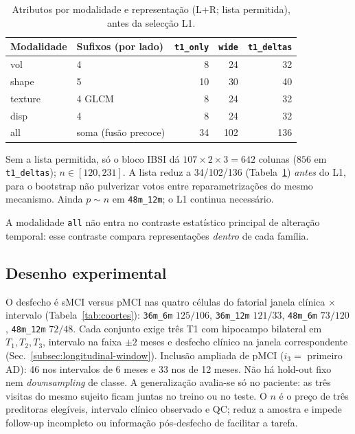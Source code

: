 \documentclass[review]{elsarticle}
\newcommand{\code}[1]{\texttt{#1}}
\begin{document}
	\begin{table}[htbp]
		\centering
		\caption{Atributos por modalidade e representação (L$+$R; lista permitida), antes da selecção L1.}
		\label{tab:dims}
		\begin{tabular}{llrrr}
			\toprule
			Modalidade & Sufixos (por lado) & \code{t1\_only} & \code{wide} & \code{t1\_deltas} \\
			\midrule
			vol     & 4 & 8  & 24  & 32 \\
			shape   & 5 & 10 & 30  & 40 \\
			texture & 4 GLCM & 8  & 24  & 32 \\
			disp    & 4 & 8 & 24 & 32 \\
			all     & soma (fusão precoce) & 34 & 102 & 136 \\
			\bottomrule
		\end{tabular}
	\end{table}
	
	Sem a lista permitida, só o bloco IBSI dá $107\times 2\times 3=642$ colunas ($856$ em \code{t1\_deltas});
$n\in[120,231]$. A lista reduz a 34/102/136 (Tabela~\ref{tab:dims}) \emph{antes} do L1,
para o bootstrap não pulverizar votos entre reparametrizações do mesmo mecanismo.
Ainda $p\sim n$ em \code{48m\_12m}; o L1 continua necessário.


	A modalidade \code{all} não entra no contraste estatístico principal de alteração temporal: esse contraste compara representações \emph{dentro} de cada família.
	
	\subsection{Desenho experimental}
	\label{sec:experiments}
	
	O desfecho é sMCI versus pMCI nas quatro células do fatorial janela clínica $\times$ intervalo (Tabela~\ref{tab:coortes}): \code{36m\_6m} $125/106$, \code{36m\_12m} $121/33$, \code{48m\_6m} $73/120$, \code{48m\_12m} $72/48$.
	Cada conjunto exige três T1 com hipocampo bilateral em $T_1,T_2,T_3$, intervalo na faixa $\pm 2$ meses e desfecho clínico na janela correspondente (Sec.~\ref{subsec:longitudinal-window}).
	Inclusão ampliada de pMCI ($i_3=$ primeiro AD): 46 nos intervalos de 6 meses e 33 nos de 12 meses.
	Não há hold-out fixo nem \emph{downsampling} de classe.
	A generalização avalia-se só no paciente: as três visitas do mesmo sujeito ficam juntas no treino ou no teste.
	O $n$ é o preço de três preditoras elegíveis, intervalo clínico observado e QC; reduz a amostra e impede follow-up incompleto ou informação pós-desfecho de facilitar a tarefa.
	
\end{document}

